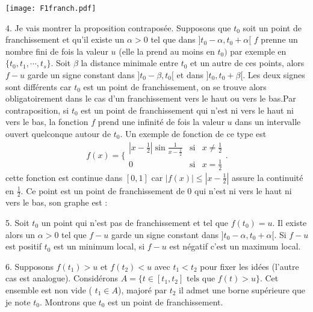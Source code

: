 \begin{floatingfigure}{5cm}
\texttt{[image: F1franch.pdf]}
\end{floatingfigure}
4.  Je vais montrer la proposition contrapos{\'e}e. Supposons que
$t_{0}$
soit un point de franchissement et qu'il existe un $\alpha >0$ tel que dans $%
] t_{0}-\alpha ,t_{0}+\alpha [ $ $f$ prenne un nombre fini de
fois la valeur $u$ (elle la prend au moins en $t_{0})$ par exemple en $%
\{ t_{0},t_{1},\cdots ,t_{s}\} $. Soit $\beta $ la distance
minimale entre $t_{0}$ et un autre de ces points, alors $f-u$
garde un signe constant dans $] t_{0}-\beta ,t_{0}[ $ et dans $]
t_{0},t_{0}+\beta [ $. Les deux signes sont diff{\'e}rents car
$t_{0}$ est un point de franchissement, on se trouve alors
obligatoirement dans le cas d'un franchissement vers le haut ou
vers le bas.\newline Par contraposition, si $t_{0}$ est un point
de franchissement qui n'est ni vers le haut ni vers le bas, la
fonction $f$ prend une infinit{\'e} de fois la valeur $u$ dans un
intervalle ouvert quelconque autour de $t_{0}$. Un exemple de
fonction de ce type est
\[
f(x)=\{
\begin{array}{ccc}
| x-\frac{1}{2}| \sin \frac{1}{x-\frac{1}{2}} & \text{si} & x\neq
\frac{1}{2} \\
0 & \text{si} & x=\frac{1}{2}
\end{array}
.
\]
cette fonction est continue dans $[ 0,1] $ car $|
f(x)| \leq | x-\frac{1}{2}| $ assure la continuit{\'e} en $%
\frac{1}{2}.$ Ce point est un point de franchissement de $0$ qui
n'est ni vers le haut ni vers le bas, son graphe est :

5.  Soit $t_{0}$ un point qui n'est pas de franchissement et tel que $%
f(t_{0})=u$. Il existe alors un $\alpha >0$ tel que $f-u$ garde un
signe constant dans $] t_{0}-\alpha ,t_{0}+\alpha [ $. Si $f-u$
est positif $t_{0}$ est un minimum local, si $f-u$ est n{\'e}gatif
c'est un maximum local.

6.  Supposons $f(t_{1})>u$ et $f(t_{2})<u$ avec $t_{1}<t_{2}$ pour
fixer les id{\'e}es (l'autre cas est analogue). Consid{\'e}rons
$A=\{ t\in [ t_{1},t_{2}] \text{ tels que }f(t)>u\} $. Cet
ensemble est non vide ( $t_{1}\in A$), major{\'e} par $t_{2}$ il
admet une borne sup{\'e}rieure que je note $t_{0}$. Montrons que
$t_{0}$ est un point de franchissement.

